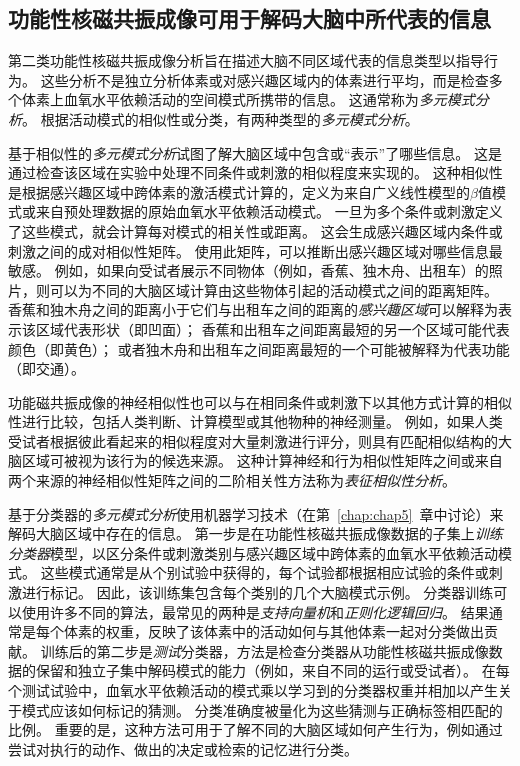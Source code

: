 \subsection{功能性核磁共振成像可用于解码大脑中所代表的信息}

第二类功能性核磁共振成像分析旨在描述大脑不同区域代表的信息类型以指导行为。
这些分析不是独立分析体素或对感兴趣区域内的体素进行平均，而是检查多个体素上血氧水平依赖活动的空间模式所携带的信息。 
这通常称为\textit{多元模式分析}。
根据活动模式的相似性或分类，有两种类型的\textit{多元模式分析}。


基于相似性的\textit{多元模式分析}试图了解大脑区域中包含或“表示”了哪些信息。 
这是通过检查该区域在实验中处理不同条件或刺激的相似程度来实现的。 
这种相似性是根据感兴趣区域中跨体素的激活模式计算的，定义为来自广义线性模型的$\beta$值模式或来自预处理数据的原始血氧水平依赖活动模式。
一旦为多个条件或刺激定义了这些模式，就会计算每对模式的相关性或距离。 
这会生成感兴趣区域内条件或刺激之间的成对相似性矩阵。 
使用此矩阵，可以推断出感兴趣区域对哪些信息最敏感。 
例如，如果向受试者展示不同物体（例如，香蕉、独木舟、出租车）的照片，则可以为不同的大脑区域计算由这些物体引起的活动模式之间的距离矩阵。
香蕉和独木舟之间的距离小于它们与出租车之间的距离的\textit{感兴趣区域}可以解释为表示该区域代表形状（即凹面）；
香蕉和出租车之间距离最短的另一个区域可能代表颜色（即黄色）；
或者独木舟和出租车之间距离最短的一个可能被解释为代表功能（即交通）。


功能磁共振成像的神经相似性也可以与在相同条件或刺激下以其他方式计算的相似性进行比较，包括人类判断、计算模型或其他物种的神经测量。
例如，如果人类受试者根据彼此看起来的相似程度对大量刺激进行评分，则具有匹配相似结构的大脑区域可被视为该行为的候选来源。
这种计算神经和行为相似性矩阵之间或来自两个来源的神经相似性矩阵之间的二阶相关性方法称为\textit{表征相似性分析}。


基于分类器的\textit{多元模式分析}使用机器学习技术（在第~\ref{chap:chap5}~章中讨论）来解码大脑区域中存在的信息。 
第一步是在功能性核磁共振成像数据的子集上\textit{训练分类器}模型，以区分条件或刺激类别与感兴趣区域中跨体素的血氧水平依赖活动模式。
这些模式通常是从个别试验中获得的，每个试验都根据相应试验的条件或刺激进行标记。
因此，该训练集包含每个类别的几个大脑模式示例。
分类器训练可以使用许多不同的算法，最常见的两种是\textit{支持向量机}和\textit{正则化逻辑回归}。
结果通常是每个体素的权重，反映了该体素中的活动如何与其他体素一起对分类做出贡献。
训练后的第二步是\textit{测试}分类器，方法是检查分类器从功能性核磁共振成像数据的保留和独立子集中解码模式的能力（例如，来自不同的运行或受试者）。
在每个测试试验中，血氧水平依赖活动的模式乘以学习到的分类器权重并相加以产生关于模式应该如何标记的猜测。
分类准确度被量化为这些猜测与正确标签相匹配的比例。
重要的是，这种方法可用于了解不同的大脑区域如何产生行为，例如通过尝试对执行的动作、做出的决定或检索的记忆进行分类。



